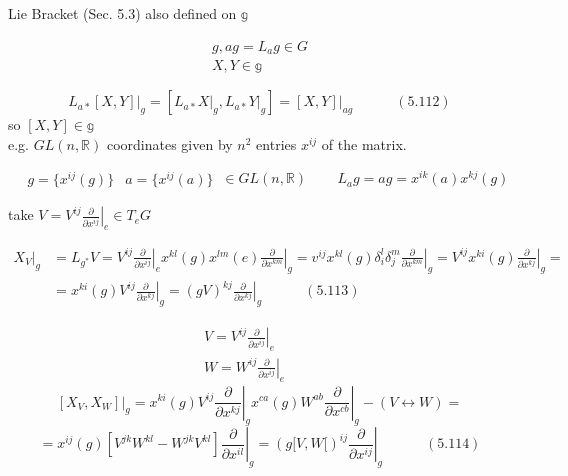 \documentclass[twoside]{amsart}
\begin{document}
Lie Bracket (Sec. 5.3) also defined on $\mathbb{g}$ 

\[
\begin{gathered}
  g, ag = L_ag \in G \\ 
  X,Y \in \mathbb{g}
\end{gathered}
\]

\begin{equation}
\left. L_{a*}[ X,Y]  \right|_g = [ L_{a*} \left. X \right|_g, L_{a*} \left. Y \right|_g ] = \left. [X,Y] \right|_{ag} \quad \quad \quad (5.112)
\end{equation}
so $[X,Y] \in \mathbb{g}$ \\

e.g. $GL(n,\mathbb{R})$ coordinates given by $n^2$ entries $x^{ij}$ of the matrix.  

\[
\begin{aligned}
  & g = \lbrace x^{ij}(g) \rbrace 
  & a = \lbrace x^{ij}(a) \rbrace
\end{aligned} \, \in GL(n, \mathbb{R}) \quad \quad \, L_a g = ag = x^{ik}(a) x^{kj}(g)
\]

take $V = V^{ij} \left. \frac{ \partial }{ \partial x^{ij} } \right|_e \in T_eG$ 

\begin{equation}
\begin{aligned}
  \left. X_V \right|_g & = L_{g^*} V = V^{ij} \left. \frac{ \partial }{ \partial x^{ij} } \right|_e x^{kl}(g) x^{lm}(e) \left. \frac{ \partial }{ \partial x^{km}} \right|_g = v^{ij} x^{kl}(g) \delta_i^l \delta^m_j \left. \frac{ \partial }{ \partial x^{km}} \right|_g = V^{ij} x^{ki}(g) \left. \frac{ \partial }{ \partial x^{kj} } \right|_g = \\
  & = x^{ki}(g) V^{ij} \left. \frac{ \partial }{ \partial x^{kj} } \right|_g = (gV)^{kj} \left. \frac{ \partial }{ \partial x^{kj} } \right|_g \quad \quad \quad (5.113)
\end{aligned}
\end{equation}

\[
\begin{aligned}
  & V = V^{ij} \left. \frac{ \partial }{ \partial x^{ij} } \right|_e \\ 
  &  W = W^{ij} \left. \frac{ \partial }{ \partial x^{ij} } \right|_e 
\end{aligned} \quad \quad \quad 
\]
\[
\left. [X_V, X_W ] \right|_g = x^{ki}(g) V^{ij} \left. \frac{ \partial }{ \partial x^{kj} } \right|_g x^{ca}(g) W^{ab} \left. \frac{ \partial }{ \partial x^{cb} } \right|_g - (V \leftrightarrow W ) = 
\]
\begin{equation}
  =  x^{ij}(g) [ V^{jk} W^{kl} - W^{jk} V^{kl} ] \left. \frac{ \partial }{ \partial x^{il} } \right|_g = ( g[V,W[)^{ij} \left. \frac{ \partial }{ \partial x^{ij} } \right|_g \quad \quad \quad (5.114)
\end{equation}
\end{document}
